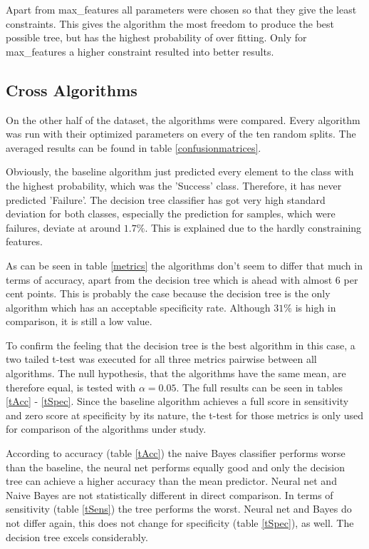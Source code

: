 \documentclass[a4paper,11pt]{article}
\begin{document}
Apart from max\_features all parameters were chosen so that they give the least constraints. This gives the algorithm the most freedom to produce the best possible tree, but has the highest probability of over fitting. Only for max\_features a higher constraint resulted into better results.




\subsection{Cross Algorithms}


On the other half of the dataset, the algorithms were compared. Every algorithm was run with their optimized parameters on every of the ten random splits. The averaged results can be found in table \ref{confusionmatrices}.

Obviously, the baseline algorithm just predicted every element to the class with the highest probability, which was the 'Success' class. Therefore, it has never predicted 'Failure'. The decision tree classifier has got very high standard deviation for both classes, especially the prediction for samples, which were failures, deviate at around $1.7\%$. This is explained due to the hardly constraining features.

As can be seen in table \ref{metrics} the algorithms don't seem to differ that much in terms of accuracy, apart from the decision tree which is ahead with almost $6$ per cent points. This is probably the case because the decision tree is the only algorithm which has an acceptable specificity rate. Although $31\%$ is high in comparison, it is still a low value. 

To confirm the feeling that the decision tree is the best algorithm in this case, a two tailed t-test was executed for all three metrics pairwise between all algorithms. The null hypothesis, that the algorithms have the same mean, are therefore equal, is tested with $\alpha = 0.05$. The full results can be seen in tables \ref{tAcc} - \ref{tSpec}.
Since the baseline algorithm achieves a full score in sensitivity and zero score at specificity by its nature, the t-test for those metrics is only used for comparison of the algorithms under study.

According to accuracy (table \ref{tAcc}) the naive Bayes classifier performs worse than the baseline, the neural net performs equally good and only the decision tree can achieve a higher accuracy than the mean predictor. Neural net and Naive Bayes are not statistically different in direct comparison. 
In terms of sensitivity (table \ref{tSens}) the tree performs the worst. Neural net and Bayes do not differ again, this does not change for specificity (table \ref{tSpec}), as well. The decision tree excels considerably. 
\end{document}
